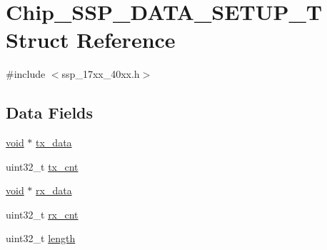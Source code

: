 \hypertarget{structChip__SSP__DATA__SETUP__T}{\section{Chip\-\_\-\-S\-S\-P\-\_\-\-D\-A\-T\-A\-\_\-\-S\-E\-T\-U\-P\-\_\-\-T Struct Reference}
\label{structChip__SSP__DATA__SETUP__T}
}


{\ttfamily \#include $<$ssp\-\_\-17xx\-\_\-40xx.\-h$>$}

\subsection*{Data Fields}
\begin{DoxyCompactItemize}
\item 
\hyperlink{Paradigm_2Tern__EE_2small_2portmacro_8h_a14d32f8130d3c0b212cfc751730b5b49}{void} $\ast$ \hyperlink{structChip__SSP__DATA__SETUP__T_a490e82f2648097f22faa108b59d89848}{tx\-\_\-data}
\item 
uint32\-\_\-t \hyperlink{structChip__SSP__DATA__SETUP__T_ab37848675426612b2fd0e986dbd2d260}{tx\-\_\-cnt}
\item 
\hyperlink{Paradigm_2Tern__EE_2small_2portmacro_8h_a14d32f8130d3c0b212cfc751730b5b49}{void} $\ast$ \hyperlink{structChip__SSP__DATA__SETUP__T_a06371dd1c78e3cb326a2ccc2811f0346}{rx\-\_\-data}
\item 
uint32\-\_\-t \hyperlink{structChip__SSP__DATA__SETUP__T_a74d6f8529c17e5e1ce7e78cdeb1a39b4}{rx\-\_\-cnt}
\item 
uint32\-\_\-t \hyperlink{structChip__SSP__DATA__SETUP__T_ac5202ff04a3ed639dce258e31a9000d6}{length}
\end{DoxyCompactItemize}



